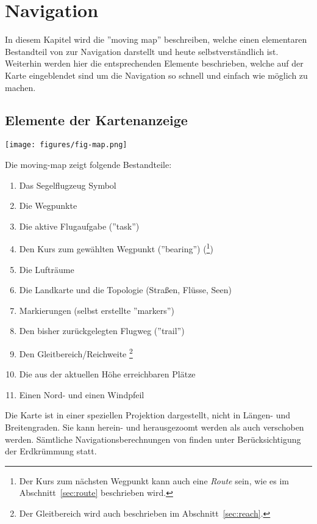 \chapter{Navigation}\label{cha:navigation}

In diesem Kapitel wird die ''moving map'' beschreiben, welche einen elementaren Bestandteil von \xc zur Navigation darstellt und heute selbstverständlich ist. 
Weiterhin werden hier die entsprechenden Elemente beschrieben, welche auf der Karte eingeblendet sind um die Navigation so schnell und einfach wie möglich zu machen.

\section{Elemente der Kartenanzeige}

\begin{maxipage}\centering
\texttt{[image: figures/fig-map.png]}
\end{maxipage}

Die moving-map zeigt folgende Bestandteile:

\begin{enumerate}[itemsep=-0.25ex]
  \item Das Segelflugzeug Symbol
  \item Die Wegpunkte
  \item Die aktive Flugaufgabe (''task'')
  \item Den Kurs zum gewählten Wegpunkt (''bearing'')
     (\footnote{Der Kurs zum nächsten Wegpunkt kann auch eine {\em Route} sein, wie es im Abschnitt~\ref{sec:route} beschrieben wird.})
    \item Die Lufträume
  \item Die Landkarte und die Topologie (Straßen, Flüsse, Seen)
  \item Markierungen (selbst erstellte ''markers'')
  \item Den bisher zurückgelegten Flugweg (''trail'')
  \item Den Gleitbereich/Reichweite \footnote{Der Gleitbereich wird auch beschrieben im Abschnitt~\ref{sec:reach}.}
  \item Die aus der aktuellen Höhe erreichbaren Plätze
  \item Einen Nord-  und einen Windpfeil
\end{enumerate}

Die Karte ist in einer speziellen Projektion dargestellt, nicht in Längen- und Breitengraden. Sie kann herein- und herausgezoomt werden als auch verschoben werden. Sämtliche Navigationsberechnungen von \xc finden unter Berücksichtigung der Erdkrümmung statt.
